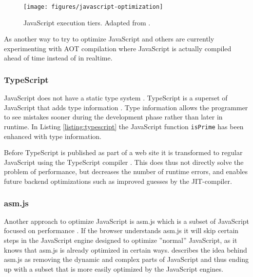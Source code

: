 \begin{figure}[!h]
\centering
\texttt{[image: figures/javascript-optimization]}
\caption{JavaScript execution tiers. Adapted from \textcite{ParkKimMoon2017,ZhuykovVardanyanMelnikBuchatskiySharygin2015}.}
\label{javascript-optimization}
\end{figure}        

As another way to try to optimize JavaScript \textcite{ParkJungMoon2015,ZhuykovVardanyanMelnikBuchatskiySharygin2015} and others are currently experimenting with AOT compilation where JavaScript is actually compiled ahead of time instead of in realtime.

\subsubsection{TypeScript}

JavaScript does not have a static type system \parencite{Park2014}. TypeScript is a superset of JavaScript that adds type information \parencite{DeWolffHage2017}. Type information allows the programmer to see mistakes sooner during the development phase rather than later in runtime. In Listing \ref{listing:typescript} the JavaScript function \texttt{isPrime} has been enhanced with type information.



Before TypeScript is published as part of a web site it is transformed to regular JavaScript using the TypeScript compiler \parencite{ReiserBlaser2017}. This does thus not directly solve the problem of performance, but decreases the number of runtime errors, and enables future backend optimizations such as improved guesses by the JIT-compiler.

\subsubsection{asm.js}

Another approach to optimize JavaScript is asm.js which is a subset of JavaScript focused on performance \parencite{Zakai2018}. If the browser understands asm.js it will skip certain steps in the JavaScript engine designed to optimize ''normal'' JavaScript, as it knows that asm.js is already optimized in certain ways. \textcite{Zakai2018} describes the idea behind asm.js as removing the dynamic and complex parts of JavaScript and thus ending up with a subset that is more easily optimized by the JavaScript engines.

